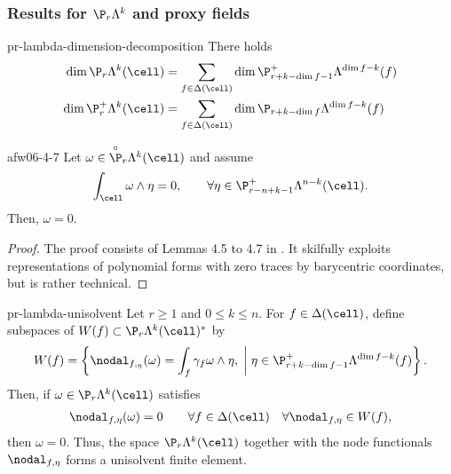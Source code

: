 \subsubsection{Results for $\P_r\Lambda^k$ and proxy fields}

\begin{Lemma}{pr-lambda-dimension-decomposition}
  There holds
  \begin{align}
    \dim \P_r\Lambda^k(\cell)
    &= \sum_{f\in\Delta(\cell)}
      \dim \P_{r+k-\dim f-1}^+\Lambda^{\dim f-k}(f) \\
    \dim \P_r^+\Lambda^k(\cell)
    &= \sum_{f\in\Delta(\cell)}
      \dim \P_{r+k-\dim f}\Lambda^{\dim f-k}(f)
  \end{align}
\end{Lemma}


\begin{Lemma}{afw06-4-7}
  Let $\omega \in \overset{\circ}{\P}_r \Lambda^k(\cell)$ and assume
  \begin{gather}
    \int_\cell\omega\wedge\eta = 0,
    \qquad\forall \eta\in\P_{r-n+k-1}^+\Lambda^{n-k}(\cell).
  \end{gather}
  Then, $\omega = 0$.
\end{Lemma}

\begin{proof}
  The proof consists of Lemmas 4.5 to 4.7 in
  \cite{ArnoldFalkWinther06acta}. It skilfully exploits representations of
  polynomial forms with zero traces by barycentric coordinates, but is
  rather technical.
\end{proof}

\begin{Theorem}{pr-lambda-unisolvent}
  Let $r\ge 1$ and $0\le k \le n$. For $f\in \Delta(\cell)$, define
  subspaces of $W(f) \subset \P_r\Lambda^k(\cell)^*$ by
  \begin{gather}
    W(f) = \left\{
      \nodal_{f,_\eta}(\omega) = \int_f \gamma_f \omega\wedge\eta,
      \;\middle\vert\;
       \eta \in \P_{r+k-\dim f-1}^+\Lambda^{\dim f-k}(f)
      \right\}.
  \end{gather}
  Then, if $\omega \in \P_r\Lambda^k(\cell)$ satisfies
  \begin{gather}
    \nodal_{f,\eta}(\omega) = 0
    \qquad \forall f\in \Delta(\cell)
    \quad\forall \nodal_{f,\eta} \in W(f),
  \end{gather}
  then $\omega = 0$. Thus, the space $\P_r\Lambda^k(\cell)$ together
  with the node functionals $\nodal_{f,\eta}$ forms a unisolvent
  finite element.
\end{Theorem}

